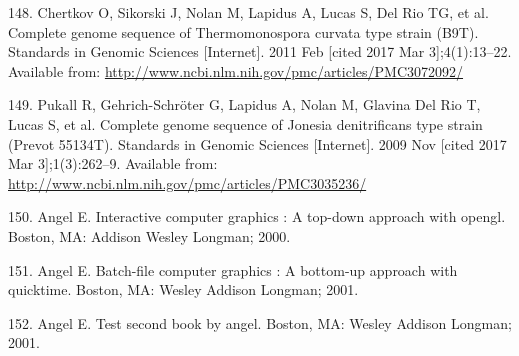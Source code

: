 \documentclass[12pt,twoside]{reedthesis}
\begin{document}
  \hypertarget{ref-chertkov_complete_2011}{}
  148. Chertkov O, Sikorski J, Nolan M, Lapidus A, Lucas S, Del Rio TG, et
  al. Complete genome sequence of Thermomonospora curvata type strain
  (B9T). Standards in Genomic Sciences {[}Internet{]}. 2011 Feb {[}cited
  2017 Mar 3{]};4(1):13--22. Available from:
  \url{http://www.ncbi.nlm.nih.gov/pmc/articles/PMC3072092/}
  
  \hypertarget{ref-pukall_complete_2009}{}
  149. Pukall R, Gehrich-Schröter G, Lapidus A, Nolan M, Glavina Del Rio
  T, Lucas S, et al. Complete genome sequence of Jonesia denitrificans
  type strain (Prevot 55134T). Standards in Genomic Sciences
  {[}Internet{]}. 2009 Nov {[}cited 2017 Mar 3{]};1(3):262--9. Available
  from: \url{http://www.ncbi.nlm.nih.gov/pmc/articles/PMC3035236/}
  
  \hypertarget{ref-angel2000}{}
  150. Angel E. Interactive computer graphics : A top-down approach with
  opengl. Boston, MA: Addison Wesley Longman; 2000.
  
  \hypertarget{ref-angel2001}{}
  151. Angel E. Batch-file computer graphics : A bottom-up approach with
  quicktime. Boston, MA: Wesley Addison Longman; 2001.
  
  \hypertarget{ref-angel2002a}{}
  152. Angel E. Test second book by angel. Boston, MA: Wesley Addison
  Longman; 2001.


\end{document}

